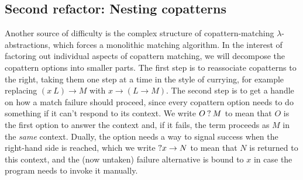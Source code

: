 \documentclass[sigplan,screen]{acmart}
\begin{document}


\subsection{Second refactor: Nesting copatterns}

Another source of difficulty is the complex structure of copattern-matching
$\lambda$-abstractions, which forces a monolithic matching algorithm.  In the
interest of factoring out individual aspects of copattern matching, we will
decompose the copattern options into smaller parts.  The first step is to
reassociate copatterns to the right, taking them one step at a time in the style
of currying, for example replacing $(x~L) \to M$ with $x \to (L \to M)$.  The
second step is to get a handle on how a match failure should proceed, since
every copattern option needs to do something if it can't respond to its context.
We write $O \mathbin{?} M$ to mean that $O$ is the first option to answer the context
and, if it fails, the term proceeds as $M$ in the \emph{same} context.  Dually,
the option needs a way to signal success when the right-hand side is reached,
which we write $\mathbin{?} x \to N$ to mean that $N$ is returned to this context, and
the (now untaken) failure alternative is bound to $x$ in case the program needs
to invoke it manually.
\end{document}
